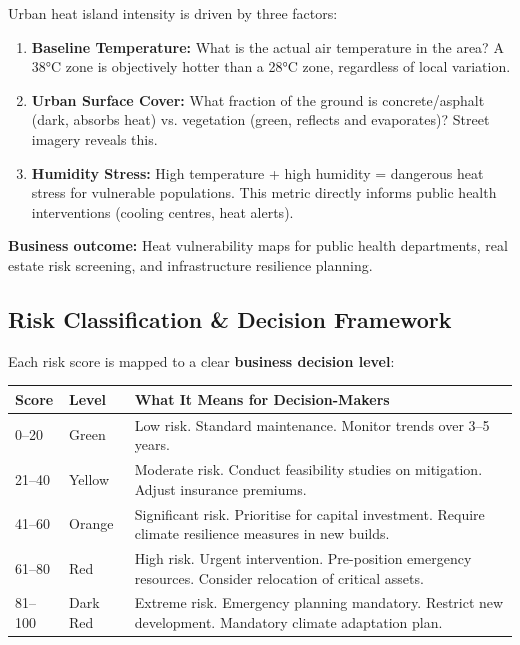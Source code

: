 \documentclass[11pt, a4paper]{article}
\begin{document}
Urban heat island intensity is driven by three factors:

\begin{enumerate}[label=\arabic*., leftmargin=1.5em, itemsep=4pt]
  \item \textbf{Baseline Temperature:} What is the actual air temperature in the area?
    A 38°C zone is objectively hotter than a 28°C zone, regardless of local variation.
  
  \item \textbf{Urban Surface Cover:} What fraction of the ground is concrete/asphalt (dark, absorbs heat)
    vs. vegetation (green, reflects and evaporates)? Street imagery reveals this.
  
  \item \textbf{Humidity Stress:} High temperature + high humidity = dangerous heat stress for vulnerable populations.
    This metric directly informs public health interventions (cooling centres, heat alerts).
\end{enumerate}

\textbf{Business outcome:} Heat vulnerability maps for public health departments, real estate risk screening,
and infrastructure resilience planning.

\subsection*{Risk Classification \& Decision Framework}

Each risk score is mapped to a clear \textbf{business decision level}:

\begin{center}
\begin{tabular}{llp{6cm}}
\toprule
\textbf{Score} & \textbf{Level} & \textbf{What It Means for Decision-Makers} \\
\midrule
0–20   & \textcolor{emerald}{Green}   & Low risk. Standard maintenance. Monitor trends over 3–5 years. \\
21–40  & \textcolor{amber}{Yellow}  & Moderate risk. Conduct feasibility studies on mitigation. Adjust insurance premiums. \\
41–60  & \textcolor{danger}{Orange}  & Significant risk. Prioritise for capital investment. Require climate resilience measures in new builds. \\
61–80  & \textcolor{danger}{Red}     & High risk. Urgent intervention. Pre-position emergency resources. Consider relocation of critical assets. \\
81–100 & \textcolor{danger}{Dark Red} & Extreme risk. Emergency planning mandatory. Restrict new development. Mandatory climate adaptation plan. \\
\bottomrule
\end{tabular}
\end{center}
\end{document}
